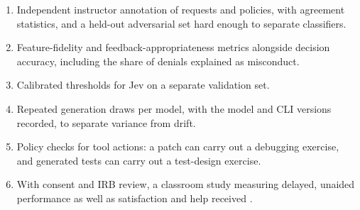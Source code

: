 \documentclass[11pt,letterpaper]{article}
\begin{document}
\begin{enumerate}
\item Independent instructor annotation of requests and policies, with agreement statistics, and a held-out adversarial set hard enough to separate classifiers.
\item Feature-fidelity and feedback-appropriateness metrics alongside decision accuracy, including the share of denials explained as misconduct.
\item Calibrated thresholds for Jev on a separate validation set.
\item Repeated generation draws per model, with the model and CLI versions recorded, to separate variance from drift.
\item Policy checks for tool actions: a patch can carry out a debugging exercise, and generated tests can carry out a test-design exercise.
\item With consent and IRB review, a classroom study measuring delayed, unaided performance as well as satisfaction and help received \citep{bastani2025,bassner2026}.
\end{enumerate}



\end{document}
